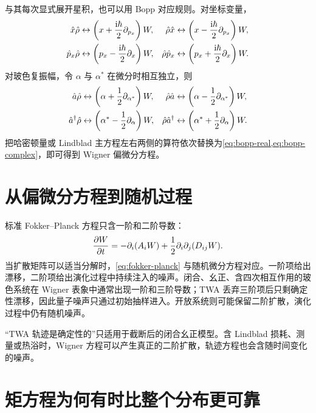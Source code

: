 与其每次显式展开星积，也可以用 Bopp 对应规则。对坐标变量，
\begin{align}
  \hat x\hat\rho&\leftrightarrow
  \left(x+\frac{\mathrm{i}\hbar}{2}\partial_{p_x}\right)W,
  &\hat\rho\hat x&\leftrightarrow
  \left(x-\frac{\mathrm{i}\hbar}{2}\partial_{p_x}\right)W,\\
  \hat p_x\hat\rho&\leftrightarrow
  \left(p_x-\frac{\mathrm{i}\hbar}{2}\partial_x\right)W,
  &\hat\rho\hat p_x&\leftrightarrow
  \left(p_x+\frac{\mathrm{i}\hbar}{2}\partial_x\right)W.
  \label{eq:bopp-real}
\end{align}
对玻色复振幅，令 $\alpha$ 与 $\alpha^*$ 在微分时相互独立，则
\begin{align}
  \hat a\hat\rho&\leftrightarrow
  \left(\alpha+\frac12\partial_{\alpha^*}\right)W,
  &\hat\rho\hat a&\leftrightarrow
  \left(\alpha-\frac12\partial_{\alpha^*}\right)W,\\
  \hat a^{\dagger}\hat\rho&\leftrightarrow
  \left(\alpha^*-\frac12\partial_\alpha\right)W,
  &\hat\rho\hat a^{\dagger}&\leftrightarrow
  \left(\alpha^*+\frac12\partial_\alpha\right)W.
  \label{eq:bopp-complex}
\end{align}
把哈密顿量或 Lindblad 主方程左右两侧的算符依次替换为\cref{eq:bopp-real,eq:bopp-complex}，即可得到 Wigner 偏微分方程。

\section{从偏微分方程到随机过程}

标准 Fokker--Planck 方程只含一阶和二阶导数：
\begin{equation}
  \frac{\partial W}{\partial t}
  =-\partial_i(A_iW)
  +\frac12\partial_i\partial_j(D_{ij}W).
  \label{eq:fokker-planck}
\end{equation}
当扩散矩阵可以适当分解时，\cref{eq:fokker-planck} 与随机微分方程对应。一阶项给出漂移，二阶项给出演化过程中持续注入的噪声。闭合、幺正、含四次相互作用的玻色系统在 Wigner 表象中通常出现一阶和三阶导数；TWA 丢弃三阶项后只剩确定性漂移，因此量子噪声只通过初始抽样进入。开放系统则可能保留二阶扩散，演化过程中仍有随机噪声。

\begin{warningbox}
“TWA 轨迹是确定性的”只适用于截断后的闭合幺正模型。含 Lindblad 损耗、测量或热浴时，Wigner 方程可以产生真正的二阶扩散，轨迹方程也会含随时间变化的噪声。
\end{warningbox}

\section{矩方程为何有时比整个分布更可靠}

